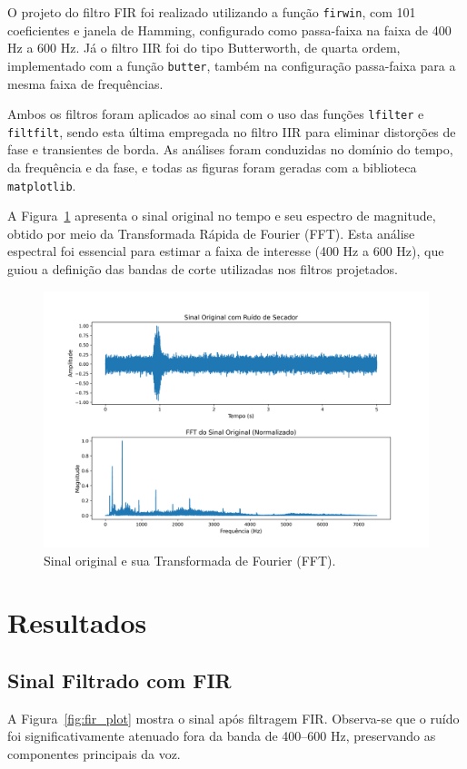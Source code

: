 \documentclass[a4paper,12pt]{article}
\begin{document}
O projeto do filtro FIR foi realizado utilizando a função \texttt{firwin}, com 101 coeficientes e janela de Hamming, configurado como passa-faixa na faixa de 400 Hz a 600 Hz. Já o filtro IIR foi do tipo Butterworth, de quarta ordem, implementado com a função \texttt{butter}, também na configuração passa-faixa para a mesma faixa de frequências.

Ambos os filtros foram aplicados ao sinal com o uso das funções \texttt{lfilter} e \texttt{filtfilt}, sendo esta última empregada no filtro IIR para eliminar distorções de fase e transientes de borda. As análises foram conduzidas no domínio do tempo, da frequência e da fase, e todas as figuras foram geradas com a biblioteca \texttt{matplotlib}.

A Figura~\ref{fig:orig_plot} apresenta o sinal original no tempo e seu espectro de magnitude, obtido por meio da Transformada Rápida de Fourier (FFT). Esta análise espectral foi essencial para estimar a faixa de interesse (400 Hz a 600 Hz), que guiou a definição das bandas de corte utilizadas nos filtros projetados.

\begin{figure}[!htbp]
	\centering
	\captionsetup{skip=0pt}
	\includegraphics[width=\textwidth,height=0.8\textheight,keepaspectratio]{original_plot.png}
	\caption{Sinal original e sua Transformada de Fourier (FFT).}
	\label{fig:orig_plot}
\end{figure}

	
	\section{Resultados}
	
	\subsection{Sinal Filtrado com FIR}
	A Figura~\ref{fig:fir_plot} mostra o sinal após filtragem FIR. Observa-se que o ruído foi significativamente atenuado fora da banda de 400–600 Hz, preservando as componentes principais da voz.
	
\end{document}
